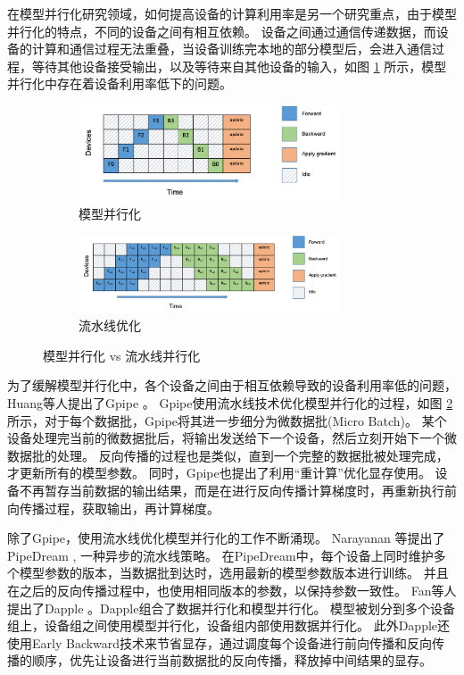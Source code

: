 在模型并行化研究领域，如何提高设备的计算利用率是另一个研究重点，由于模型并行化的特点，不同的设备之间有相互依赖。
设备之间通过通信传递数据，而设备的计算和通信过程无法重叠，当设备训练完本地的部分模型后，会进入通信过程，等待其他设备接受输出，以及等待来自其他设备的输入，如图 \ref{fig:mp-time} 所示，模型并行化中存在着设备利用率低下的问题。

\begin{figure}[h]
	\centering
	\begin{subfigure}[b]{0.85\textwidth}
		\centering
		\includegraphics[width=0.85\textwidth]{figure/2-background/mp-time.png}
		\caption{模型并行化}
		\label{fig:mp-time}
	\end{subfigure}
	\begin{subfigure}[b]{0.95\textwidth}
		\centering
		\includegraphics[width=0.85\textwidth]{figure/2-background/gpipe.png}
		\caption{流水线优化}
		\label{fig:gpipe}
	\end{subfigure}
	\caption{模型并行化 vs 流水线并行化}
	\label{fig:mp-gpipe}
\end{figure}

为了缓解模型并行化中，各个设备之间由于相互依赖导致的设备利用率低的问题，Huang等人提出了Gpipe 。
Gpipe使用流水线技术优化模型并行化的过程，如图 \ref{fig:gpipe}所示，对于每个数据批，Gpipe将其进一步细分为微数据批(Micro Batch)。
某个设备处理完当前的微数据批后，将输出发送给下一个设备，然后立刻开始下一个微数据批的处理。
反向传播的过程也是类似，直到一个完整的数据批被处理完成，才更新所有的模型参数。
同时，Gpipe也提出了利用“重计算”优化显存使用。
设备不再暂存当前数据的输出结果，而是在进行反向传播计算梯度时，再重新执行前向传播过程，获取输出，再计算梯度。

除了Gpipe，使用流水线优化模型并行化的工作不断涌现。
Narayanan 等提出了PipeDream , 一种异步的流水线策略。
在PipeDream中，每个设备上同时维护多个模型参数的版本，当数据批到达时，选用最新的模型参数版本进行训练。
并且在之后的反向传播过程中，也使用相同版本的参数，以保持参数一致性。
Fan等人提出了Dapple 。Dapple组合了数据并行化和模型并行化。
模型被划分到多个设备组上，设备组之间使用模型并行化，设备组内部使用数据并行化。
此外Dapple还使用Early Backward技术来节省显存，通过调度每个设备进行前向传播和反向传播的顺序，优先让设备进行当前数据批的反向传播，释放掉中间结果的显存。


